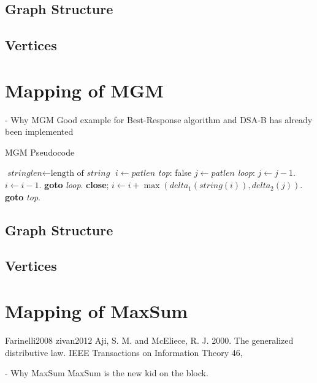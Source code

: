 \subsection{Graph Structure}
\subsection{Vertices}

\section{Mapping of MGM}

     - Why MGM
     Good example for Best-Response algorithm and DSA-B has already been implemented

    \begin{algorithm}
\caption{MGM Pseudocode}\label{euclid}
\begin{algorithmic}[2]
\State $\textit{stringlen} \gets \text{length of }\textit{string}$
\State $i \gets \textit{patlen}$
\BState \emph{top}:
 \Return false
\EndIf
\State $j \gets \textit{patlen}$
\BState \emph{loop}:
\State $j \gets j-1$.
\State $i \gets i-1$.
\State \textbf{goto} \emph{loop}.
\State \textbf{close};
\EndIf
\State $i \gets i+\max(\textit{delta}_1(\textit{string}(i)),\textit{delta}_2(j))$.
\State \textbf{goto} \emph{top}.
\EndProcedure
\end{algorithmic}
\end{algorithm}

\subsection{Graph Structure}
\subsection{Vertices}

\section{Mapping of MaxSum}

\cite{Yedidsion}
Farinelli2008
zivan2012
Aji, S. M. and McEliece, R. J. 2000. The generalized distributive law. IEEE Transactions on Information Theory 46,
    
    - Why MaxSum
    MaxSum is the new kid on the block.

